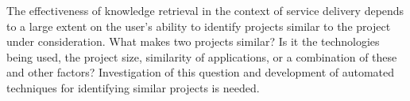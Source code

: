 The effectiveness of knowledge retrieval in the context of service delivery
depends to a large extent on the user's ability to identify projects similar to
the project under consideration. What makes two projects similar? Is it the
technologies being used, the project size, similarity of applications, or a
combination of these and other factors? Investigation of this question and
development of automated techniques for identifying similar projects is needed.



